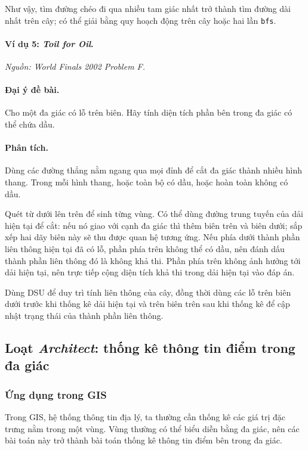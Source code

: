 \documentclass[11pt]{article}
\begin{document}
Như vậy, tìm đường chéo đi qua nhiều tam giác nhất trở thành tìm đường dài nhất
trên cây; có thể giải bằng quy hoạch động trên cây hoặc hai lần
\texttt{bfs}.

\paragraph{Ví dụ 5: \emph{Toil for Oil}.}
\emph{Nguồn: World Finals 2002 Problem F.}

\paragraph{Đại ý đề bài.}
Cho một đa giác có lỗ trên biên. Hãy tính diện tích phần bên trong đa giác có
thể chứa dầu.

\paragraph{Phân tích.}
Dùng các đường thẳng nằm ngang qua mọi đỉnh để cắt đa giác thành nhiều hình
thang. Trong mỗi hình thang, hoặc toàn bộ có dầu, hoặc hoàn toàn không có dầu.

Quét từ dưới lên trên để sinh từng vùng. Có thể dùng đường trung tuyến của dải
hiện tại để cắt: nếu nó giao với cạnh đa giác thì thêm biên trên và biên dưới;
sắp xếp hai dãy biên này sẽ thu được quan hệ tương ứng. Nếu phía dưới thành
phần liên thông hiện tại đã có lỗ, phần phía trên không thể có dầu, nên đánh dấu
thành phần liên thông đó là không khả thi. Phần phía trên không ảnh hưởng tới
dải hiện tại, nên trực tiếp cộng diện tích khả thi trong dải hiện tại vào đáp
án.

Dùng DSU để duy trì tính liên thông của cây, đồng thời dùng các lỗ trên biên
dưới trước khi thống kê dải hiện tại và trên biên trên sau khi thống kê để cập
nhật trạng thái của thành phần liên thông.

\subsection{Loạt \emph{Architect}: thống kê thông tin điểm trong đa giác}

\subsubsection{Ứng dụng trong GIS}

Trong GIS, hệ thống thông tin địa lý, ta thường cần thống kê các giá trị đặc
trưng nằm trong một vùng. Vùng thường có thể biểu diễn bằng đa giác, nên các bài
toán này trở thành bài toán thống kê thông tin điểm bên trong đa giác.
\end{document}
